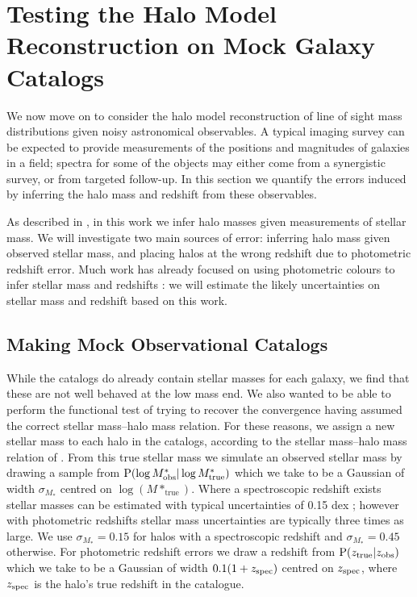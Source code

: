 \documentclass[useAMS,usenatbib]{mn2e}
\begin{document}

\section{Testing the Halo Model Reconstruction on Mock Galaxy Catalogs}
\label{sec:obsMstar+z}

We now move on to consider the halo model reconstruction of line of sight mass
distributions given noisy astronomical observables. A typical imaging survey
can be expected to provide measurements of the positions and magnitudes of
galaxies in a field;  spectra for some of the objects may either come from a
synergistic survey, or from targeted follow-up. In this section we quantify
the errors induced by inferring the halo mass and redshift from these
observables. 

As described in , in this work we infer halo masses
given measurements of stellar mass. We will investigate two main sources of
error: inferring halo mass given observed stellar mass, and placing halos at
the wrong redshift due to photometric redshift error. Much work has already
focused on using photometric colours to infer stellar mass
\citep[\eg][]{AugerEtal2009} and redshifts \citep[\eg][]{BPZ}: we will
estimate the likely uncertainties on stellar mass and redshift based on this
work.  

\subsection{Making Mock Observational Catalogs}

While the \MS catalogs do already contain stellar masses for each galaxy, we
find that these are not well behaved at the low mass end. 
We also wanted to be able to perform the functional test of
trying to recover the convergence having assumed the correct stellar
mass--halo mass relation. For these reasons, we assign a new stellar mass to
each halo in the \MS catalogs, according to the stellar mass--halo mass
relation of  \citet{BehrooziEtal2010}. From this true  stellar mass we
simulate an observed stellar mass by drawing a sample from 
${\rm P}(\log{M^{*}_{\rm obs}}|\log{M^{*}_{\rm true}})$ which we take to be a
Gaussian of width $\sigma_{M_*}$ centred on $\log(M*_{\mathrm {true}})$. Where
a spectroscopic redshift exists stellar masses can be estimated with typical
uncertainties of 0.15 dex \citep{AugerEtal2009}; however with photometric
redshifts stellar mass uncertainties are typically three times as large. We
use $\sigma_{M_*}=0.15$ for halos with a spectroscopic redshift and
$\sigma_{M_*}=0.45$ otherwise. For photometric redshift errors we draw a
redshift from ${\rm P}(z_{\rm true}|z_{\rm obs})$ which we take to be a Gaussian
of width $0.1(1+z_{\rm spec})$ centred on $z_{\rm spec}$, where $z_{\rm spec}$
is the halo's true redshift in the \MS catalogue.
\end{document}
